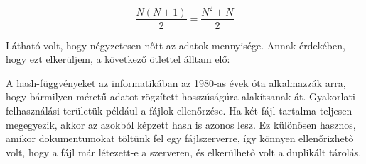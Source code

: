 \begin{equation}\label{eq:1}
\frac{N(N+1)}{2} = \frac{N^2+N}{2}
\end{equation}

Látható volt, hogy négyzetesen nőtt az adatok mennyisége. Annak érdekében, hogy ezt elkerüljem, a következő ötlettel álltam elő:

A hash-függvényeket az informatikában az 1980-as évek óta alkalmazzák arra, hogy bármilyen méretű adatot rögzített hosszúságúra alakítsanak át. Gyakorlati felhasználási területük például a fájlok ellenőrzése. Ha két fájl tartalma teljesen megegyezik, akkor az azokból képzett hash is azonos lesz. Ez különösen hasznos, amikor dokumentumokat töltünk fel egy fájlszerverre, így könnyen ellenőrizhető volt, hogy a fájl már létezett-e a szerveren, és elkerülhető volt a duplikált tárolás.

